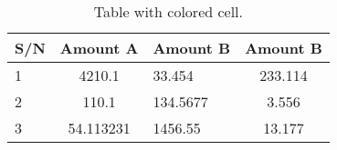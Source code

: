 \documentclass{article}
\begin{document}
	
\begin{table}[h!]
	\begin{center}
		\caption{Table with colored cell.}
		\label{tab:table1}
		\begin{tabular}{|l|S|s|c|}
			\hline
			\textbf{S/N} & \textbf{Amount A} & \textbf{Amount B} & \textbf{Amount B}\\
			\hline
			1 & 4210.1 & 33.454 & 233.114\\
			2 & 110.1 & 134.5677 & 3.556\\
			3 & 54.113231 & 1456.55 & 13.177\\
			\hline
			\end{tabular}
		\end{center}
	\end{table}
\end{document}

